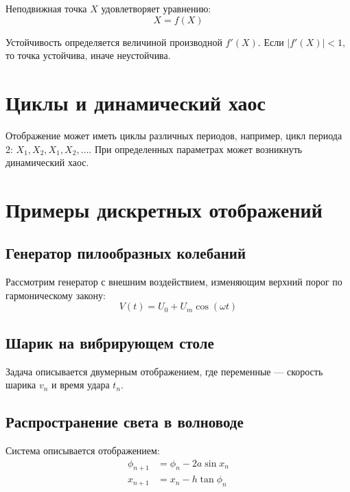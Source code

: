 \documentclass[a4paper,12pt]{article}
\begin{document}
Неподвижная точка $X$ удовлетворяет уравнению:
\begin{equation}
X = f(X)
\end{equation}

Устойчивость определяется величиной производной $f'(X)$. Если $|f'(X)| < 1$, то точка устойчива, иначе неустойчива.

\section{Циклы и динамический хаос}

Отображение может иметь циклы различных периодов, например, цикл периода 2: $X_1, X_2, X_1, X_2, \ldots$. При определенных параметрах может возникнуть динамический хаос.

\section{Примеры дискретных отображений}

\subsection{Генератор пилообразных колебаний}

Рассмотрим генератор с внешним воздействием, изменяющим верхний порог по гармоническому закону:
\begin{equation}
V(t) = U_0 + U_m \cos(\omega t)
\end{equation}

\subsection{Шарик на вибрирующем столе}

Задача описывается двумерным отображением, где переменные — скорость шарика $v_n$ и время удара $t_n$.

\subsection{Распространение света в волноводе}

Система описывается отображением:
\begin{align}
\phi_{n+1} &= \phi_n - 2a \sin x_n \\
x_{n+1} &= x_n - h \tan \phi_n
\end{align}
\end{document}
